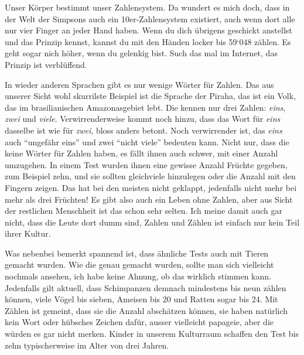 Unser Körper bestimmt unser Zahlensystem. Da wundert es mich doch, dass in der Welt der Simpsons auch ein 10er-Zahlensystem existiert, auch wenn dort alle nur vier Finger an jeder Hand haben. Wenn du dich übrigens geschickt anstellst und das Prinzip kennst, kannst du mit den Händen locker bis 59‘048 zählen. Es geht sogar nich höher, wenn du gelenkig bist. Such das mal im Internet, das Prinzip ist verblüffend. 

In wieder anderen Sprachen gibt es nur wenige Wörter für Zahlen. Das aus unserer Sicht wohl skurrilste Beispiel ist die Sprache der Piraha, das ist ein Volk, das im brasilianischen Amazonasgebiet lebt. Die kennen nur drei Zahlen: \textit{eins}, \textit{zwei} und \textit{viele}. Verwirrenderweise kommt noch hinzu, dass das Wort für \textit{eins} dasselbe ist wie für \textit{zwei}, bloss anders betont. Noch verwirrender ist, das \textit{eins} auch \enquote{ungefähr eins} und zwei \enquote{nicht viele} bedeuten kann. Nicht nur, dass die keine Wörter für Zahlen haben, es fällt ihnen auch schwer, mit einer Anzahl umzugehen. In einem Test wurden ihnen eine gewisse Anzahl Früchte gegeben, zum Beispiel zehn, und sie sollten gleichviele hinzulegen oder die Anzahl mit den Fingern zeigen. Das hat bei den meisten nicht geklappt, jedenfalls nicht mehr bei mehr als drei Früchten! Es gibt also auch ein Leben ohne Zahlen, aber aus Sicht der restlichen Menschheit ist das schon sehr selten. Ich meine damit auch gar nicht, dass die Leute dort dumm sind, Zahlen und Zählen ist einfach nur kein Teil ihrer Kultur.

Was nebenbei bemerkt spannend ist, dass ähnliche Tests auch mit Tieren gemacht wurden. Wie die genau gemacht wurden, sollte man sich vielleicht nochmals ansehen, ich habe keine Ahnung, ob das wirklich stimmen kann. Jedenfalls gilt aktuell, dass Schimpanzen demnach mindestens bis neun zählen können, viele Vögel bis sieben, Ameisen bis 20 und Ratten sogar bis 24. Mit Zählen ist gemeint, dass sie die Anzahl abschätzen können, sie haben natürlich kein Wort oder hübsches Zeichen dafür, ausser vielleicht papageie, aber die würden es gar nicht merken. Kinder in unserem Kulturraum schaffen den Test bis zehn typischerweise im Alter von drei Jahren. \hfill {}
\newpage 
